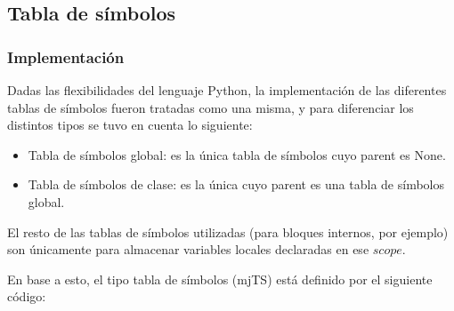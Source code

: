 \documentclass [a4paper,abstracton,titlepage]{scrartcl}
\begin{document}
\subsection{Tabla de símbolos}
  \subsubsection{Implementación}
Dadas las flexibilidades del lenguaje Python, la implementación de las
diferentes tablas de símbolos fueron tratadas como una misma, y para
diferenciar los distintos tipos se tuvo en cuenta lo siguiente:

  \begin{itemize}
   \item Tabla de símbolos global: es la única tabla de símbolos cuyo parent es
None.
   \item Tabla de símbolos de clase: es la única cuyo parent es una tabla de
símbolos global.
  \end{itemize}

El resto de las tablas de símbolos utilizadas (para bloques internos, por
ejemplo) son únicamente para almacenar variables locales declaradas en
ese $scope$.

En base a esto, el tipo tabla de símbolos (mjTS) está definido por el siguiente
código:
\end{document}
